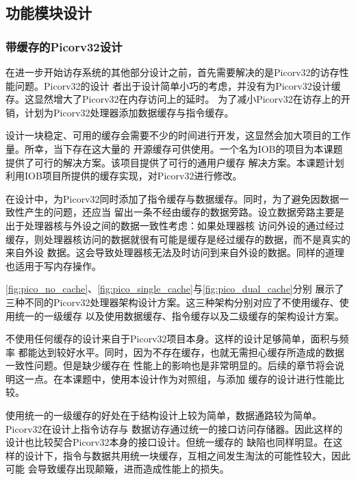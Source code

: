 \subsection{功能模块设计}
\label{section:design_module}

\subsubsection{带缓存的Picorv32设计}

在进一步开始访存系统的其他部分设计之前，首先需要解决的是Picorv32的访存性能问题。Picorv32的设计
者出于设计简单小巧的考虑，并没有为Picorv32设计缓存。这显然增大了Picorv32在内存访问上的延时。
为了减小Picorv32在访存上的开销，计划为Picorv32处理器添加数据缓存与指令缓存。

设计一块稳定、可用的缓存会需要不少的时间进行开发，这显然会加大项目的工作量。所幸，当下存在这大量的
开源缓存可供使用。一个名为IOB的项目为本课题提供了可行的解决方案\cite{roque2021iob}。该项目提供了可行的通用户缓存
解决方案。本课题计划利用IOB项目所提供的缓存实现，对Picorv32进行修改。

在设计中，为Picorv32同时添加了指令缓存与数据缓存。同时，为了避免因数据一致性产生的问题，还应当
留出一条不经由缓存的数据旁路。设立数据旁路主要是出于处理器核与外设之间的数据一致性考虑：如果处理器核
访问外设的通过经过缓存，则处理器核访问的数据就很有可能是缓存是经过缓存的数据，而不是真实的来自外设
数据。这会导致处理器核无法及时访问到来自外设的数据。同样的道理也适用于写内存操作。

\autoref{fig:pico_no_cache}、\autoref{fig:pico_single_cache}与\autoref{fig:pico_dual_cache}分别
展示了三种不同的Picorv32处理器架构设计方案。这三种架构分别对应了不使用缓存、使用统一的一级缓存
以及使用数据缓存、指令缓存以及二级缓存的架构设计方案。


不使用任何缓存的设计来自于Picorv32项目本身\cite{picorv32}。这样的设计足够简单，面积与频率
都能达到较好水平。同时，因为不存在缓存，也就无需担心缓存所造成的数据一致性问题。但是缺少缓存在
性能上的影响也是非常明显的。后续的章节将会说明这一点。在本课题中，使用本设计作为对照组，与添加
缓存的设计进行性能比较。


使用统一的一级缓存的好处在于结构设计上较为简单，数据通路较为简单。Picorv32在设计上指令访存与
数据访存通过统一的接口访问存储器。因此这样的设计也比较契合Picorv32本身的接口设计。但统一缓存的
缺陷也同样明显。在这样的设计下，指令与数据共用统一块缓存，互相之间发生淘汰的可能性较大，因此可能
会导致缓存出现颠簸，进而造成性能上的损失。

